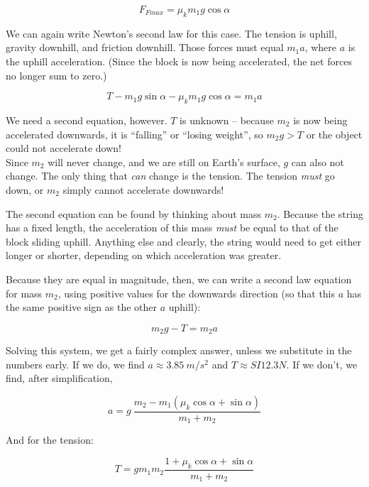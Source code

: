 \begin{equation}
F_{Fmax} = \mu_k m_1 g \cos \alpha
\end{equation}

We can again write Newton's second law for this case. The tension is uphill, gravity downhill, and friction downhill. Those forces must equal $m_1 a$, where $a$ is the uphill acceleration. (Since the block is now being accelerated, the net forces no longer sum to zero.)

\begin{equation}
T - m_1 g \sin \alpha - \mu_k m_1 g \cos \alpha = m_1 a
\end{equation}

We need a second equation, however. $T$ is unknown -- because $m_2$ is now being accelerated downwards, it is ``falling'' or ``losing weight'', so $m_2 g > T$ or the object could not accelerate down!\\
Since $m_2$ will never change, and we are still on Earth's surface, $g$ can also not change. The only thing that \emph{can} change is the tension. The tension \emph{must} go down, or $m_2$ simply cannot accelerate downwards!

The second equation can be found by thinking about mass $m_2$. Because the string has a fixed length, the acceleration of this mass \emph{must} be equal to that of the block sliding uphill. Anything else and clearly, the string would need to get either longer or shorter, depending on which acceleration was greater.

Because they are equal in magnitude, then, we can write a second law equation for mass $m_2$, using positive values for the downwards direction (so that this $a$ has the same positive sign as the other $a$ uphill):

\begin{equation}
m_2 g - T = m_2 a
\end{equation}

Solving this system, we get a fairly complex answer, unless we substitute in the numbers early. If we do, we find $a \approx \SI{3.85}{m/s^2}$ and $T \approx {SI}{12.3}{N}$. If we don't, we find, after simplification,

\begin{equation}
a = g\ \frac{m_2 - m_1 (\mu_k \cos \alpha + \sin \alpha)}{m_1 + m_2}
\end{equation}

And for the tension:

\begin{equation}
T = g m_1 m_2 \frac{1 + \mu_k \cos\alpha + \sin \alpha}{m_1 + m_2}
\end{equation}

